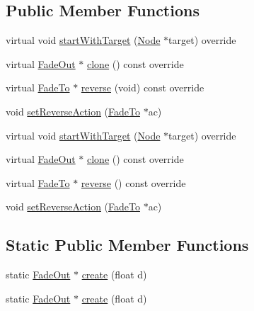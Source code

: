 \subsection*{Public Member Functions}
\begin{DoxyCompactItemize}
\item 
virtual void \hyperlink{classFadeOut_a41e8895429e5942e43b3a60c117e0a2b}{start\+With\+Target} (\hyperlink{classNode}{Node} $\ast$target) override
\item 
virtual \hyperlink{classFadeOut}{Fade\+Out} $\ast$ \hyperlink{classFadeOut_af06dabca5e73a8ed67560c2540bbbb1f}{clone} () const override
\item 
virtual \hyperlink{classFadeTo}{Fade\+To} $\ast$ \hyperlink{classFadeOut_aefa1585ac126946418ca92cb74b8a130}{reverse} (void) const override
\item 
void \hyperlink{classFadeOut_a806e69bcba677e4aa9ced24f667753c7}{set\+Reverse\+Action} (\hyperlink{classFadeTo}{Fade\+To} $\ast$ac)
\item 
virtual void \hyperlink{classFadeOut_a95f4db5b66b8fea0e41ae9da60c3e730}{start\+With\+Target} (\hyperlink{classNode}{Node} $\ast$target) override
\item 
virtual \hyperlink{classFadeOut}{Fade\+Out} $\ast$ \hyperlink{classFadeOut_a03d1d3960ed0439bb40f120f14f1a4b5}{clone} () const override
\item 
virtual \hyperlink{classFadeTo}{Fade\+To} $\ast$ \hyperlink{classFadeOut_a18e27b1b9737d0f99604d683a1e185a8}{reverse} () const override
\item 
void \hyperlink{classFadeOut_a806e69bcba677e4aa9ced24f667753c7}{set\+Reverse\+Action} (\hyperlink{classFadeTo}{Fade\+To} $\ast$ac)
\end{DoxyCompactItemize}
\subsection*{Static Public Member Functions}
\begin{DoxyCompactItemize}
\item 
static \hyperlink{classFadeOut}{Fade\+Out} $\ast$ \hyperlink{classFadeOut_a623198ca778e18f3dc88dea0460253ec}{create} (float d)
\item 
static \hyperlink{classFadeOut}{Fade\+Out} $\ast$ \hyperlink{classFadeOut_a38525e3cd25930cf0c95a0feeb1f8238}{create} (float d)
\end{DoxyCompactItemize}
